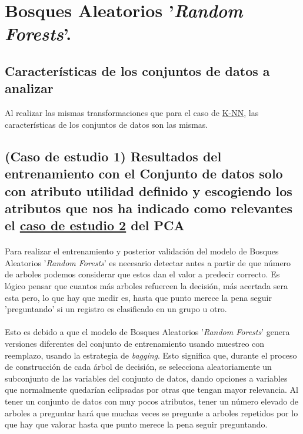 \section{Bosques Aleatorios '\textit{Random Forests}'.}
\label{resultados:rf}

\subsection{Características de los conjuntos de datos a analizar}
\label{resultados:rf_caracteristicas}
Al realizar las mismas transformaciones que para el caso de \hyperref[resultados:knn_caracteristicas]{K-NN}, las características de los conjuntos de datos son las mismas.

\subsection{(Caso de estudio 1) Resultados del entrenamiento con el Conjunto de datos solo con atributo utilidad definido y escogiendo los atributos que nos ha indicado como relevantes el \hyperref[result:pca_case2]{caso de estudio 2} del PCA}

\paragraph{}
Para realizar el entrenamiento y posterior validación del modelo de Bosques Aleatorios '\textit{Random Forests}' es necesario detectar antes a partir de que número de arboles podemos considerar que estos dan el valor a predecir correcto. Es lógico pensar que cuantos más arboles refuercen la decisión, más acertada sera esta pero, lo que hay que medir es, hasta que punto merece la pena seguir 'preguntando' si un registro es clasificado en un grupo u otro.

\paragraph{}
Esto es debido a que el modelo de Bosques Aleatorios '\textit{Random Forests}'\cite{ref:rf_def} genera versiones diferentes del conjunto de entrenamiento usando muestreo con reemplazo, usando la estrategia de \textit{bagging}\cite{ref:rf_bagging}. Esto significa que, durante el proceso de construcción de cada árbol de decisión, se selecciona aleatoriamente un subconjunto de las variables del conjunto de datos, dando opciones a variables que normalmente quedarían eclipsadas por otras que tengan mayor relevancia. Al tener un conjunto de datos con muy pocos atributos, tener un número elevado de arboles a preguntar hará que muchas veces se pregunte a arboles repetidos por lo que hay que valorar hasta que punto merece la pena seguir preguntando.

